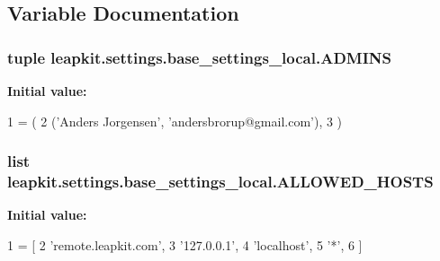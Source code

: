 \subsection{Variable Documentation}
\hypertarget{namespaceleapkit_1_1settings_1_1base__settings__local_ab9f8210c55142b46baf2374af4447421}{
\subsubsection[{A\-D\-M\-I\-N\-S}]{\setlength{\rightskip}{0pt plus 5cm}tuple leapkit.\-settings.\-base\-\_\-settings\-\_\-local.\-A\-D\-M\-I\-N\-S}}\label{namespaceleapkit_1_1settings_1_1base__settings__local_ab9f8210c55142b46baf2374af4447421}
{\bfseries Initial value\-:}
\begin{DoxyCode}
1 = (
2     (\textcolor{stringliteral}{'Anders Jorgensen'}, \textcolor{stringliteral}{'andersbrorup@gmail.com'}),
3 )
\end{DoxyCode}
\hypertarget{namespaceleapkit_1_1settings_1_1base__settings__local_a185e8583ef8f8aeae3517746541daec9}{
\subsubsection[{A\-L\-L\-O\-W\-E\-D\-\_\-\-H\-O\-S\-T\-S}]{\setlength{\rightskip}{0pt plus 5cm}list leapkit.\-settings.\-base\-\_\-settings\-\_\-local.\-A\-L\-L\-O\-W\-E\-D\-\_\-\-H\-O\-S\-T\-S}}\label{namespaceleapkit_1_1settings_1_1base__settings__local_a185e8583ef8f8aeae3517746541daec9}
{\bfseries Initial value\-:}
\begin{DoxyCode}
1 = [
2     \textcolor{stringliteral}{'remote.leapkit.com'},
3     \textcolor{stringliteral}{'127.0.0.1'},
4     \textcolor{stringliteral}{'localhost'},
5     \textcolor{stringliteral}{'*'},
6 ]
\end{DoxyCode}
